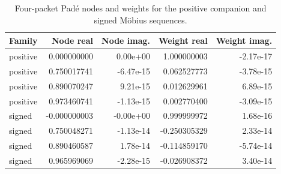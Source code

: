 \begin{table}[H]
\centering
\caption{Four-packet Pad\'e nodes and weights for the positive companion and signed M\"obius sequences.}
\small
\begin{tabular}{lrrrr}
\toprule Family & Node real & Node imag. & Weight real & Weight imag. \\ \midrule
positive & 0.000000000 & 0.00e+00 & 1.000000003 & -2.17e-17 \\
positive & 0.750017741 & -6.47e-15 & 0.062527773 & -3.78e-15 \\
positive & 0.890070247 & 9.21e-15 & 0.012629961 & 6.89e-15 \\
positive & 0.973460741 & -1.13e-15 & 0.002770400 & -3.09e-15 \\
signed & -0.000000003 & -0.00e+00 & 0.999999972 & 1.68e-16 \\
signed & 0.750048271 & -1.13e-14 & -0.250305329 & 2.33e-14 \\
signed & 0.890460587 & 1.78e-14 & -0.114859170 & -5.74e-14 \\
signed & 0.965969069 & -2.28e-15 & -0.026908372 & 3.40e-14 \\
\bottomrule
\end{tabular}
\end{table}
